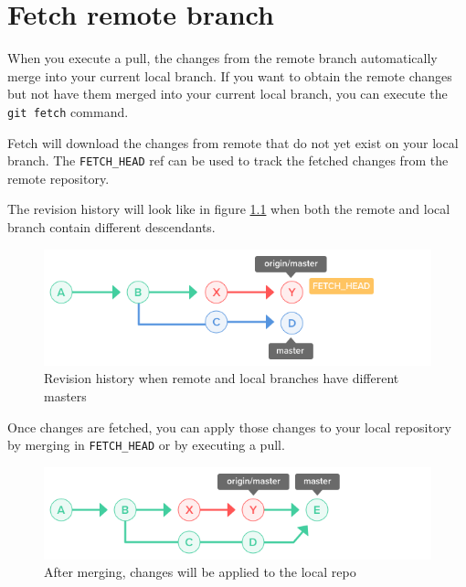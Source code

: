 \documentclass[10pt,a4paper,english]{report}
\begin{document}
\chapter{Fetch remote branch}
    \label{chap:fetch-remote}

    When you execute a pull, the changes from the remote branch automatically merge into your current local branch. If you want to obtain the remote changes but not have them merged into your current local branch, you can execute the \verb|git fetch| command.

    Fetch will download the changes from remote that do not yet exist on your local branch. The \verb|FETCH_HEAD| ref can be used to track the fetched changes from the remote repository.

    The revision history will look like in figure \ref{fig:fetch-remote-001} when both the remote and local branch contain different descendants.

    \begin{figure}[ht]
    \begin{center}
    \includegraphics[scale=0.5]{images/fetch_remote_branch_001.png}
    \end{center}
    \caption{Revision history when remote and local branches have different masters}
    \label{fig:fetch-remote-001}
    \end{figure}

    Once changes are fetched, you can apply those changes to your local repository by merging in \verb|FETCH_HEAD| or by executing a pull.

    \begin{figure}[ht]
    \begin{center}
    \includegraphics[scale=0.5]{images/fetch_remote_branch_002.png}
    \end{center}
    \caption{After merging, changes will be applied to the local repo}
    \end{figure}
\end{document}
